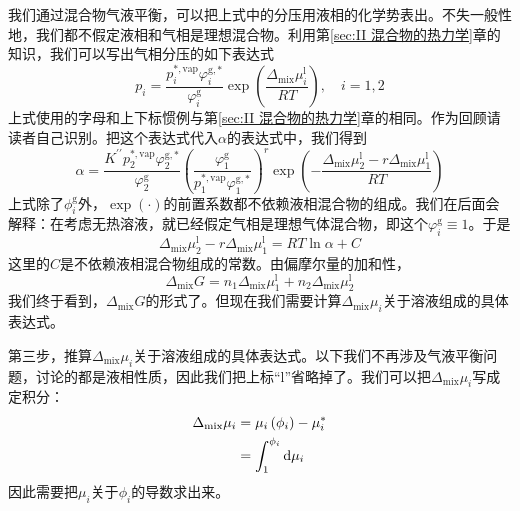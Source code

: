 \documentclass[main.tex]{subfiles}
\begin{document}
我们通过混合物气液平衡，可以把上式中的分压用液相的化学势表出。不失一般性地，我们都不假定液相和气相是理想混合物。利用第\ref{sec:II 混合物的热力学}章的知识，我们可以写出气相分压的如下表达式
\[p_i=\frac{p_i^{*,\text{vap}}\varphi_i^{\text{g},*}}{\varphi_i^\text{g}}\exp\left(\frac{\Delta_\text{mix}\mu_i^\text{l}}{RT}\right),\quad i=1,2\]
上式使用的字母和上下标惯例与第\ref{sec:II 混合物的热力学}章的相同。作为回顾请读者自己识别。把这个表达式代入$\alpha$的表达式中，我们得到
\[\alpha=\frac{K^{\prime\prime}p_2^{*,\text{vap}}\varphi_2^{\text{g},*}}{\varphi_2^\text{g}}\left(\frac{\varphi_1^\text{g}}{p_1^{*,\text{vap}}\varphi_1^{\text{g},*}}\right)^r\exp\left(-\frac{\Delta_\text{mix}\mu_2^\text{l}-r\Delta_\text{mix}\mu_1^\text{l}}{RT}\right)\]
上式除了$\phi_i^\text{g}$外，$\exp\left(\cdot\right)$的前置系数都不依赖液相混合物的组成。我们在后面会解释：在考虑无热溶液，就已经假定气相是理想气体混合物，即这个$\varphi_i^\text{g}\equiv 1$。于是
\begin{equation}\label{eq:III.3 alpha_mu_relation}\Delta_\text{mix}\mu_2^\text{l}-r\Delta_\text{mix}\mu_1^\text{l}=RT\ln\alpha+C\end{equation}
这里的$C$是不依赖液相混合物组成的常数。由偏摩尔量的加和性，
\[\Delta_\text{mix} G=n_1\Delta_\text{mix}\mu_1^\text{l}+n_2\Delta_\text{mix}\mu_2^\text{l}\]
我们终于看到，$\Delta_\text{mix} G$的形式了。但现在我们需要计算$\Delta_\text{mix}\mu_i$关于溶液组成的具体表达式。

第三步，推算$\Delta_\text{mix}\mu_i$关于溶液组成的具体表达式。以下我们不再涉及气液平衡问题，讨论的都是液相性质，因此我们把上标“l”省略掉了。我们可以把$\Delta_\text{mix}\mu_i$写成定积分：
\begin{align}
  \Delta_\text{mix}\mu_i & = \mu_i\left(\phi_i\right) - \mu_i^*                             \notag \\
                         & = \int_1^{\phi_i}\mathrm{d}\mu_i\label{eq:III.3 delta_mix_mu_integral}
\end{align}
因此需要把$\mu_i$关于$\phi_i$的导数求出来。
\end{document}
